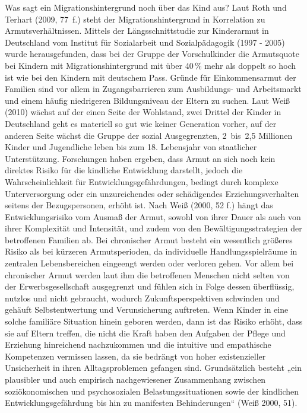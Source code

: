 Was sagt ein Migrationshintergrund noch über das Kind aus? Laut Roth und Terhart (2009, 77~f.) steht der Migrationshintergrund in Korrelation zu Armutsverhältnissen. 
Mittels der Längsschnittstudie zur Kinderarmut in Deutschland vom Institut für Sozialarbeit und Sozialpädagogik (1997 - 2005) wurde herausgefunden, dass bei der Gruppe der Vorschulkinder die Armutsquote bei Kindern mit Migrationshintergrund mit über 40\,\% mehr als doppelt so hoch ist wie bei den Kindern mit deutschem Pass. Gründe für Einkommensarmut der Familien sind vor allem in Zugangsbarrieren zum Ausbildungs- und Arbeitsmarkt und einem häufig niedrigeren Bildungsniveau der Eltern zu suchen. 
Laut Weiß (2010) wächst auf der einen Seite der Wohlstand, zwei Drittel der Kinder in Deutschland geht es materiell so gut wie keiner Generation vorher, auf der anderen Seite wächst die Gruppe der sozial Ausgegrenzten, 2~bis~2,5 Millionen Kinder und Jugendliche leben bis zum 18. Lebensjahr von staatlicher Unterstützung. 
Forschungen haben ergeben, dass Armut an sich noch kein direktes Risiko für die kindliche Entwicklung darstellt, jedoch die Wahrscheinlichkeit für Entwicklungsgefährdungen, bedingt durch komplexe Unterversorgung oder ein unzureichendes oder schädigendes Erziehungsverhalten seitens der Bezugspersonen, erhöht ist. 
Nach Weiß (2000, 52 f.) hängt das Entwicklungsrisiko vom Ausmaß der Armut, sowohl von ihrer Dauer als auch von ihrer Komplexität und Intensität, und zudem von den Bewältigungsstrategien der betroffenen Familien ab. Bei chronischer Armut besteht ein wesentlich größeres Risiko als bei kürzeren Armutsperioden, da individuelle Handlungsspielräume in zentralen Lebensbereichen eingeengt werden oder verloren gehen.
Vor allem bei chronischer Armut werden laut ihm die betroffenen Menschen nicht selten von der Erwerbsgesellschaft ausgegrenzt und fühlen sich in Folge dessen überflüssig, nutzlos und nicht gebraucht, wodurch Zukunftsperspektiven schwinden und gehäuft Selbstentwertung und Verunsicherung auftreten. Wenn Kinder in eine solche familiäre Situation hinein geboren werden, dann ist das Risiko erhöht, dass sie auf Eltern treffen, die nicht die Kraft haben den Aufgaben der Pflege und Erziehung hinreichend nachzukommen und die intuitive und empathische Kompetenzen vermissen lassen, da sie bedrängt von hoher existenzieller Unsicherheit in ihren Alltagsproblemen gefangen sind.   
Grundsätzlich besteht „ein plausibler und auch empirisch nachgewiesener Zusammenhang zwischen soziökonomischen und psychosozialen Belastungssituationen sowie der kindlichen Entwicklungsgefährdung bis hin zu manifesten Behinderungen“ (Weiß 2000, 51).

